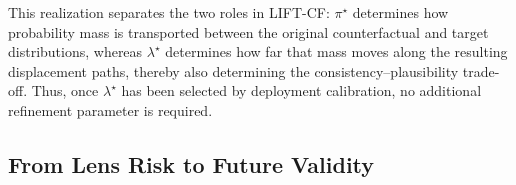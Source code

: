 This realization separates the two roles in LIFT-CF:
$\pi^\star$ determines how probability mass is transported between
the original counterfactual and target distributions, whereas
$\lambda^\star$ determines how far that mass moves along the
resulting displacement paths, thereby also determining the \textcolor{frappe_red}{consistency}--plausibility trade-off. Thus, once $\lambda^\star$ has been
selected by deployment calibration, no additional refinement
parameter is required.


\iffalse
\subsection{From Lens Risk to Future Validity}
\label{sec:future_validity}





